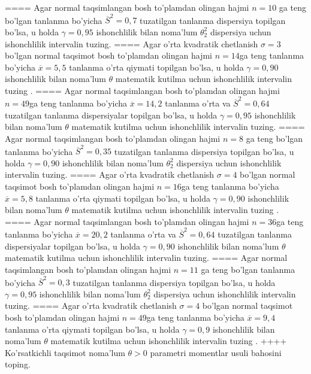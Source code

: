 ====
Agar normal taqsimlangan bosh to'plamdan olingan hajmi \(n = 10\) ga teng bo'lgan tanlanma bo'yicha \({\overline{S}}^{2} = 0,7\) tuzatilgan tanlanma dispersiya topilgan bo'lsa, u holda \(\gamma = 0,95\) ishonchlilik bilan noma'lum \(\theta_{2}^{2}\) dispersiya uchun ishonchlilik intervalin tuzing.
====
Agar o'rta kvadratik chetlanish \(\sigma = 3\) bo'lgan normal taqsimot bosh to'plamdan olingan hajmi \(n = 14\)ga teng tanlanma bo'yicha \(\overline{x} = 5,5\) tanlanma o'rta qiymati topilgan bo'lsa, u holda \(\gamma = 0,90\) ishonchlilik bilan noma'lum \(\theta\) matematik kutilma uchun ishonchlilik intervalin tuzing .
====
Agar normal taqsimlangan bosh to'plamdan olingan hajmi \(n = 49\)ga teng tanlanma bo'yicha \(\overline{x} = 14,2\) tanlanma o'rta va \({\overline{S}}^{2} = 0,64\) tuzatilgan tanlanma dispersiyalar topilgan bo'lsa, u holda \(\gamma = 0,95\) ishonchlilik bilan noma'lum \(\theta\) matematik kutilma uchun ishonchlilik intervalin tuzing.
====
Agar normal taqsimlangan bosh to'plamdan olingan hajmi \(n = 8\) ga teng bo'lgan tanlanma bo'yicha \({\overline{S}}^{2} = 0,35\) tuzatilgan tanlanma dispersiya topilgan bo'lsa, u holda \(\gamma = 0,90\) ishonchlilik bilan noma'lum \(\theta_{2}^{2}\) dispersiya uchun ishonchlilik intervalin tuzing.
====
Agar o'rta kvadratik chetlanish \(\sigma = 4\) bo'lgan normal taqsimot bosh to'plamdan olingan hajmi \(n = 16\)ga teng tanlanma bo'yicha \(\overline{x} = 5,8\) tanlanma o'rta qiymati topilgan bo'lsa, u holda \(\gamma = 0,90\) ishonchlilik bilan noma'lum \(\theta\) matematik kutilma uchun ishonchlilik intervalin tuzing .
====
Agar normal taqsimlangan bosh to'plamdan olingan hajmi \(n = 36\)ga teng tanlanma bo'yicha \(\overline{x} = 20,2\) tanlanma o'rta va \({\overline{S}}^{2} = 0,64\) tuzatilgan tanlanma dispersiyalar topilgan bo'lsa, u holda \(\gamma = 0,90\) ishonchlilik bilan noma'lum \(\theta\) matematik kutilma uchun ishonchlilik intervalin tuzing.
====
Agar normal taqsimlangan bosh to'plamdan olingan hajmi \(n = 11\) ga teng bo'lgan tanlanma bo'yicha \({\overline{S}}^{2} = 0,3\) tuzatilgan tanlanma dispersiya topilgan bo'lsa, u holda \(\gamma = 0,95\) ishonchlilik bilan noma'lum \(\theta_{2}^{2}\) dispersiya uchun ishonchlilik intervalin tuzing.
====
Agar o'rta kvadratik chetlanish \(\sigma = 4\) bo'lgan normal taqsimot bosh to'plamdan olingan hajmi \(n = 49\)ga teng tanlanma bo'yicha \(\overline{x} = 9,4\) tanlanma o'rta qiymati topilgan bo'lsa, u holda \(\gamma = 0,9\) ishonchlilik bilan noma'lum \(\theta\) matematik kutilma uchun ishonchlilik intervalin tuzing .
++++
Ko'rsatkichli taqsimot noma'lum \(\theta > 0\) parametri momentlar usuli bahosini toping.
